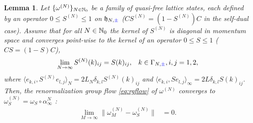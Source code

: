 \documentclass[a4paper, 11pt]{article}
\newcommand{\fh}{\mathfrak{h}}
\DeclareMathOperator{\1}{\mathds{1}}
\newtheorem{lemma}[thm]{Lemma}
\begin{document}
\begin{lemma}
\label{lem:stateconv}
Let $\{\omega^{(N)}\}_{N\in\mathbb{N}_{0}}$ be a family of quasi-free lattice states, each defined by an operator $0\leq S^{(N)}\leq1$ on $\fh_{N,{\color{blue}\pm}}$ ($CS^{(N)} = (1-S^{(N)})C$ in the self-dual case). Assume that for all $N\in\mathbb{N}_{0}$ the kernel of $S^{(N)}$ is diagonal in momentum space and converges point-wise to the kernel of an operator $0\leq S\leq 1$ ($CS = (1-S)C$),
\begin{align}
\label{eq:kernelpointlim}
\lim_{N\rightarrow\infty}S^{(N)}(k)_{ij} & = S(k)_{ij}, & k\in\Gamma_{N,{\color{blue}\pm}}, i,j=1,2,
\end{align}
where $\langle e_{k,i}, S^{(N)}e_{l,j}\rangle_{N} = 2L_{N}\delta_{k,l}S^{(N)}(k)_{ij}$ and $\langle e_{k,i}, S e_{l,j}\rangle_{\infty}= 2L\delta_{k,l}S(k)_{ij}$. Then, the renormalization group flow \eqref{eq:rgflow} of $\omega^{(N)}$ converges to $\omega^{(N)}_{S} = \omega_{S}\circ\alpha^{N}_{\infty}$ :
\begin{align}
\label{eq:2pconvnorm}
\lim_{M\rightarrow\infty}\|\omega^{(N)}_{M}-\omega^{(N)}_{S}\| & = 0.
\end{align}
\end{lemma} 
\end{document}
